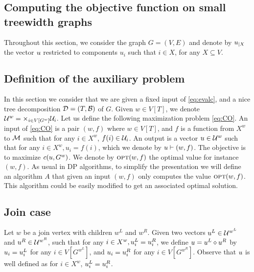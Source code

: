 \documentclass[12pt]{article}
\begin{document}
\begin{appendix}


\section{Computing the objective function on small treewidth graphs}
\label{app:tw2}

Throughout this section, we consider the graph $G=(V,E)$ and denote by $u_{|X}$ the vector $u$ restricted to components $u_i$ such that $i \in X$, for any $X \subseteq V$.

\subsection{Definition of the auxiliary problem}
In this section we consider that we are given a fixed input of \ref{eq:evalc}, and a nice tree decomposition ${\cal D}=(T,{\cal B})$ of $G$.
Given $w \in V[T]$, we denote $\mathcal{U}^w = \times_{i\in V[G^w]}\mathcal{U}_i$.
Let us define the following maximization problem \ref{eq:CO}. 
An input of \ref{eq:CO} is a pair $(w,f)$ where $w \in V[T]$, and $f$ is a function from $X^w$ to $\mathcal{M}$ such that for any $i \in X^w$, $f(i) \in \mathcal{U}_i$.
An output is a vector $u \in \mathcal{U}^w$ such that for any $i \in X^w, u_i = f(i)$, which we denote by $u \vdash (w,f)$.
The objective is to maximize $c(u,G^w)$. We denote by $\mbox{\textsc{opt}}(w,f)$ the optimal value for instance $(w,f)$.
As usual in DP algorithms, to simplify the presentation we will define an algorithm $A$ that given an input $(w,f)$ only computes the value $\mbox{\textsc{opt}}(w,f)$.
This algorithm could be easily modified to get an associated optimal solution.

\subsection{Join case}
Let $w$ be a join vertex with children $w^L$ and $w^R$.
Given two vectors $u^L \in \mathcal{U}^{w^L}$ and $u^R \in \mathcal{U}^{w^R}$, such that for any $i \in X^w, u^L_i = u^R_i$,
we define $u = u^L \diamond u^R$ by $u_i = u^L_i$ for any $i \in V[G^{w^L}]$, and $u_i = u^R_i$ for any $i \in V[G^{w^R}]$.
Observe that $u$ is well defined as for $i \in X^w$, $u^L_i = u^R_i$.


\end{appendix}
\end{document}
